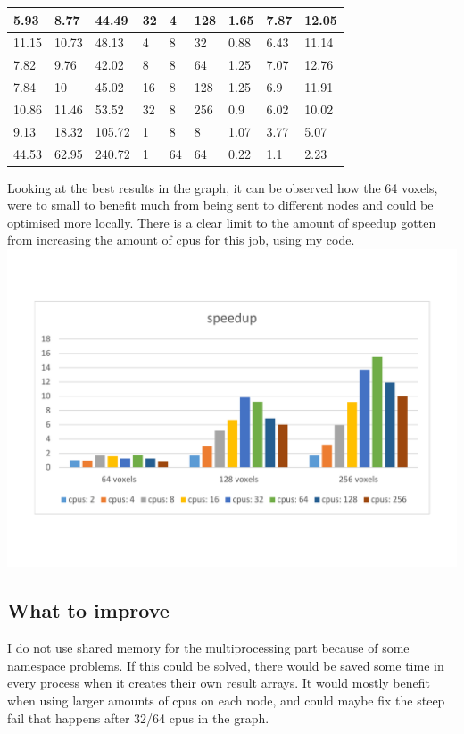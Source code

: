 \documentclass{Article}
\begin{document}
\begin{table}[]
\begin{tabular}{|l|l|l|l|l|l|l|l|l|}
5.93      & 8.77       & 44.49      & 32       & 4     & 128        & 1.65       & 7.87        & 12.05       \\ \hline
11.15     & 10.73      & 48.13      & 4        & 8     & 32         & 0.88       & 6.43        & 11.14       \\ \hline
7.82      & 9.76       & 42.02      & 8        & 8     & 64         & 1.25       & 7.07        & 12.76       \\ \hline
7.84      & 10         & 45.02      & 16       & 8     & 128        & 1.25       & 6.9         & 11.91       \\ \hline
10.86     & 11.46      & 53.52      & 32       & 8     & 256        & 0.9        & 6.02        & 10.02       \\ \hline
9.13      & 18.32      & 105.72     & 1        & 8     & 8          & 1.07       & 3.77        & 5.07        \\ \hline
44.53     & 62.95      & 240.72     & 1        & 64    & 64         & 0.22       & 1.1         & 2.23        \\ \hline
\end{tabular}
\end{table}

Looking at the best results in the graph, it can be observed how the 64 voxels, were to small to benefit much from being sent to different nodes and could be optimised more locally. There is a clear limit to the amount of speedup gotten from increasing the amount of cpus for this job, using my code. 
\includegraphics[clip, trim=0 3cm 0 3cm, width=1\textwidth]{speedup}\\

\subsection{What to improve}
I do not use shared memory for the multiprocessing part because of some namespace problems. If this could be solved, there would be saved some time in every process when it creates their own result arrays. It would mostly benefit when using larger amounts of cpus on each node, and could maybe fix the steep fail that happens after 32/64 cpus in the graph.
\end{document}
